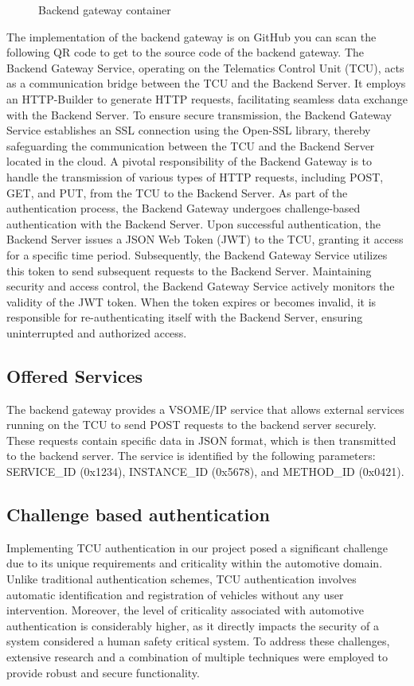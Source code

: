 \documentclass[
12pt,
oneside, 
onehalfspacing, 
nolistspacing, 
parskip, 
chapterinoneline, 
]{AASTCOMPUTER}
\begin{document}
\begin{figure}[!ht]
\begin{minipage}{0.45\textwidth}
  \caption[Backend gateway container]{Backend gateway container}
  \label{fig:Backend Gateway container}
\end{minipage}
\end{figure}
The implementation of the backend gateway is on GitHub you can scan the following QR code to get to the source code of the backend gateway.
The Backend Gateway Service, operating on the Telematics Control Unit (TCU), acts as a communication bridge between the TCU and the Backend Server. It employs an HTTP-Builder to generate HTTP requests, facilitating seamless data exchange with the Backend Server. To ensure secure transmission, the Backend Gateway Service establishes an SSL connection using the Open-SSL library, thereby safeguarding the communication between the TCU and the Backend Server located in the cloud. 
A pivotal responsibility of the Backend Gateway is to handle the transmission of various types of HTTP requests, including POST, GET, and PUT, from the TCU to the Backend Server. As part of the authentication process, the Backend Gateway undergoes challenge-based authentication with the Backend Server. Upon successful authentication, the Backend Server issues a JSON Web Token (JWT) to the TCU, granting it access for a specific time period. Subsequently, the Backend Gateway Service utilizes this token to send subsequent requests to the Backend Server.
Maintaining security and access control, the Backend Gateway Service actively monitors the validity of the JWT token. When the token expires or becomes invalid, it is responsible for re-authenticating itself with the Backend Server, ensuring uninterrupted and authorized access.

\subsection{Offered Services}
The backend gateway provides a VSOME/IP service that allows external services running on the TCU to send POST requests to the backend server securely. These requests contain specific data in JSON format, which is then transmitted to the backend server. The service is identified by the following parameters: SERVICE\_ID (0x1234), INSTANCE\_ID (0x5678), and METHOD\_ID (0x0421).

\subsection{Challenge based authentication}
Implementing TCU authentication in our project posed a significant challenge due to its unique requirements and criticality within the automotive domain. Unlike traditional authentication schemes, TCU authentication involves automatic identification and registration of vehicles without any user intervention. Moreover, the level of criticality associated with automotive authentication is considerably higher, as it directly impacts the security of a system considered a human safety critical system. To address these challenges, extensive research and a combination of multiple techniques were employed to provide robust and secure functionality.
\end{document}
